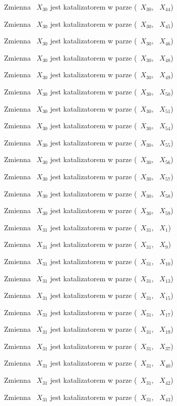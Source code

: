 \documentclass{article}
\begin{document}
Zmienna ~$X_{30}$ jest katalizatorem w parze (~$X_{30}$, ~$X_{44}$)

Zmienna ~$X_{30}$ jest katalizatorem w parze (~$X_{30}$, ~$X_{45}$)

Zmienna ~$X_{30}$ jest katalizatorem w parze (~$X_{30}$, ~$X_{46}$)

Zmienna ~$X_{30}$ jest katalizatorem w parze (~$X_{30}$, ~$X_{48}$)

Zmienna ~$X_{30}$ jest katalizatorem w parze (~$X_{30}$, ~$X_{49}$)

Zmienna ~$X_{30}$ jest katalizatorem w parze (~$X_{30}$, ~$X_{50}$)

Zmienna ~$X_{30}$ jest katalizatorem w parze (~$X_{30}$, ~$X_{51}$)

Zmienna ~$X_{30}$ jest katalizatorem w parze (~$X_{30}$, ~$X_{54}$)

Zmienna ~$X_{30}$ jest katalizatorem w parze (~$X_{30}$, ~$X_{55}$)

Zmienna ~$X_{30}$ jest katalizatorem w parze (~$X_{30}$, ~$X_{56}$)

Zmienna ~$X_{30}$ jest katalizatorem w parze (~$X_{30}$, ~$X_{57}$)

Zmienna ~$X_{30}$ jest katalizatorem w parze (~$X_{30}$, ~$X_{58}$)

Zmienna ~$X_{30}$ jest katalizatorem w parze (~$X_{30}$, ~$X_{59}$)

Zmienna ~$X_{31}$ jest katalizatorem w parze (~$X_{31}$, ~$X_{1}$)

Zmienna ~$X_{31}$ jest katalizatorem w parze (~$X_{31}$, ~$X_{9}$)

Zmienna ~$X_{31}$ jest katalizatorem w parze (~$X_{31}$, ~$X_{10}$)

Zmienna ~$X_{31}$ jest katalizatorem w parze (~$X_{31}$, ~$X_{13}$)

Zmienna ~$X_{31}$ jest katalizatorem w parze (~$X_{31}$, ~$X_{15}$)

Zmienna ~$X_{31}$ jest katalizatorem w parze (~$X_{31}$, ~$X_{17}$)

Zmienna ~$X_{31}$ jest katalizatorem w parze (~$X_{31}$, ~$X_{19}$)

Zmienna ~$X_{31}$ jest katalizatorem w parze (~$X_{31}$, ~$X_{37}$)

Zmienna ~$X_{31}$ jest katalizatorem w parze (~$X_{31}$, ~$X_{40}$)

Zmienna ~$X_{31}$ jest katalizatorem w parze (~$X_{31}$, ~$X_{42}$)

Zmienna ~$X_{31}$ jest katalizatorem w parze (~$X_{31}$, ~$X_{43}$)
\end{document}
